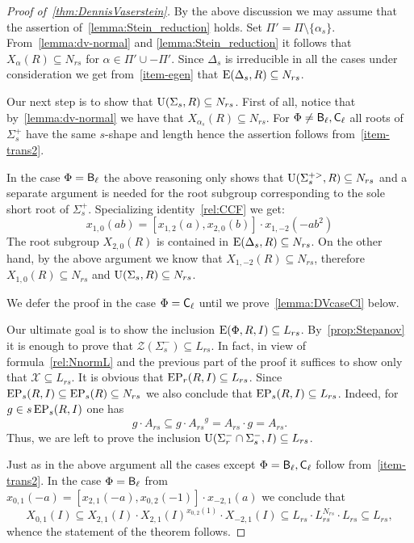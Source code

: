 \begin{proof}[Proof of~\cref{thm:DennisVaserstein}]
By the above discussion we may assume that the assertion of~\cref{lemma:Stein_reduction} holds.
Set $\Pi' = \Pi \setminus \{\alpha_s\}$.
From~\cref{lemma:dv-normal} and \cref{lemma:Stein_reduction} it follows that $X_\alpha(R) \subseteq N_{rs}$ for $\alpha \in \Pi' \cup -\Pi'$.
Since $\Delta_s$ is irreducible in all the cases under consideration we get from~\cref{item-egen} that $\operatorname{E}(\Delta_s, R) \subseteq N_{rs}$.

Our next step is to show that $\operatorname{U}(\Sigma_s, R) \subseteq N_{rs}$.
First of all, notice that by~\cref{lemma:dv-normal} we have that $X_{\alpha_s}(R) \subseteq N_{rs}$.
For $\Phi\neq \mathsf{B}_\ell, \mathsf{C}_\ell$ all roots of $\Sigma^+_s$ have the same $s$-shape and length hence the assertion follows from~\cref{item-trans2}.

In the case $\Phi=\mathsf{B}_\ell$ the above reasoning only shows that $\operatorname{U}(\Sigma_s^{+>}, R) \subseteq N_{rs}$ and a separate argument is needed for the root subgroup corresponding to the sole short root of $\Sigma_s^+$.
Specializing identity~\eqref{rel:CCF} we get:
\begin{equation*} \label{rel:CCF-specBC} x_{1,0}(ab) = [x_{1, 2}(a), x_{2, 0}(b)] \cdot x_{1,-2}(-a b^2) \end{equation*}
The root subgroup $X_{2, 0}(R)$ is contained in $\operatorname{E}(\Delta_s, R) \subseteq N_{rs}$.
On the other hand, by the above argument we know that $X_{1,-2}(R) \subseteq N_{rs}$, therefore $X_{1,0}(R) \subseteq N_{rs}$ and $\operatorname{U}(\Sigma_s, R) \subseteq N_{rs}$.

We defer the proof in the case $\Phi=\mathsf{C}_\ell$ until we prove~\cref{lemma:DVcaseCl} below.

Our ultimate goal is to show the inclusion $\operatorname{E}(\Phi, R, I) \subseteq L_{rs}$. 
By~\cref{prop:Stepanov} it is enough to prove that $\mathcal{Z}(\Sigma^-_s) \subseteq L_{rs}$.
In fact, in view of formula~\eqref{rel:NnormL} and the previous part of the proof it suffices to show only that $\mathcal{X} \subseteq L_{rs}$.
It is obvious that $\operatorname{EP}_r(R, I) \subseteq L_{rs}$.
Since $\operatorname{EP}_s(R, I) \subseteq \operatorname{EP}_s(R) \subseteq N_{rs}$ we also conclude that $\operatorname{EP}_s(R, I) \subseteq L_{rs}$.
Indeed, for $g \in s\operatorname{EP}_s(R,I)$ one has
\[ g \cdot A_{rs} \subseteq g \cdot {A_{rs}}^g = A_{rs} \cdot g = A_{rs}. \]
Thus, we are left to prove the inclusion $\operatorname{U}(\Sigma^-_r \cap \Sigma^-_s, I) \subseteq L_{rs}$.

Just as in the above argument all the cases except $\Phi = \mathsf{B}_\ell, \mathsf{C}_\ell$ follow from~\cref{item-trans2}.
In the case $\Phi=\mathsf{B}_\ell$ from $x_{0, 1}(-a) = [x_{2,1}(-a), x_{0, 2}(-1)]\cdot x_{-2,1}(a)$ we conclude that
$$X_{0,1}(I) \subseteq X_{2,1}(I) \cdot X_{2,1}(I)^{x_{0,2}(1)} \cdot X_{-2,1}(I) \subseteq L_{rs} \cdot L_{rs}^{N_{rs}} \cdot L_{rs} \subseteq L_{rs},$$
whence the statement of the theorem follows. \end{proof}

